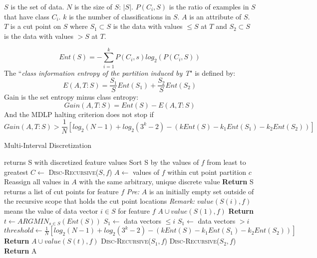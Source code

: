 $S$ is the set of data. 
$N$ is the size of $S$: $|S|$.
$P(C_i,S)$ is the ratio of examples in $S$ that have class $C_i$.
$k$ is the number of classifications in $S$.
$A$ is an attribute of $S$.
$T$ is a cut point on $S$ where $S_1 \subset S$ is the data with values $\leq S$ at $T$ and $S_2 \subset S$ is the data with values $> S$ at $T$.

\begin{equation}\label{eq:disc-entropy}
	Ent(S) = -\sum_{i=1}^{k}P(C_i,s)log_2(P(C_i,S)) 
\end{equation}
The ``\textit{class information entropy of the partition induced by T}" \cite{FayyadIrani} is defined by: 
\begin{equation}\label{eq:disc-class-entropy}
	E(A,T:S) = \frac{S_1}{S}Ent(S_1) + \frac{S_2}{S}Ent(S_2)
\end{equation}
Gain is the set entropy minus class entropy:
\begin{equation}\label{eq:disc-gain}
	Gain(A,T:S) = Ent(S) - E(A,T:S)
\end{equation}
And the MDLP halting criterion does not stop if
\begin{equation} \label{eq:disc-MDLP}
	Gain(A,T:S) > \frac{1}{N}[log_2(N-1) + log_2(3^k - 2) - (kEnt(S) - k_1Ent(S_1) - k_2Ent(S_2))]
\end{equation}

\begin{algorithm}[tbh]
\caption{Multi-Interval Discretization}\label{alg:discretize}
\begin{algorithmic}[1]
 returns S with discretized feature values
    	\State Sort S by the values of $f$ from least to greatest
        \State $C \gets $ \textsc{Disc-Recursive}($S, f$) 
        	\State $A \gets $ values of $f$ within cut point partition $c$
            \State Reassign all values in $A$ with the same arbitrary, unique discrete value 
        \EndFor
    \EndFor
    \State \textbf{Return} S 
\EndProcedure
\\
 returns a list of cut points for feature $f$
	\State \textit{Pre:} $A$ is an initially empty set outside of the recursive scope that holds the cut point locations
    \State \textit{Remark:} $value(S(i),f)$ means the value of data vector $i \in S$ for feature $f$
    	\State $A \cup value(S(1),f)$
        \State \textbf{Return}
    \EndIf
    \State $t \gets ARGMIN_{s \in S}(Ent(S))$
    \State $S_1 \gets $ data vectors $\leq i$
    \State $S_1 \gets $ data vectors $> i$
    \State $threshold \gets \frac{1}{N}[log_2(N-1) + log_2(3^k - 2) - (kEnt(S) - k_1Ent(S_1) - k_2Ent(S_2))]$
    	\State \textbf{Return}
    \Else
    	\State $A \cup value(S(t),f)$
        \State \textsc{Disc-Recursive}($S_1, f$)
        \State \textsc{Disc-Recursive}($S_2, f$)
    \EndIf  
    \State \textbf{Return} A
\EndProcedure
\end{algorithmic}
\end{algorithm}

